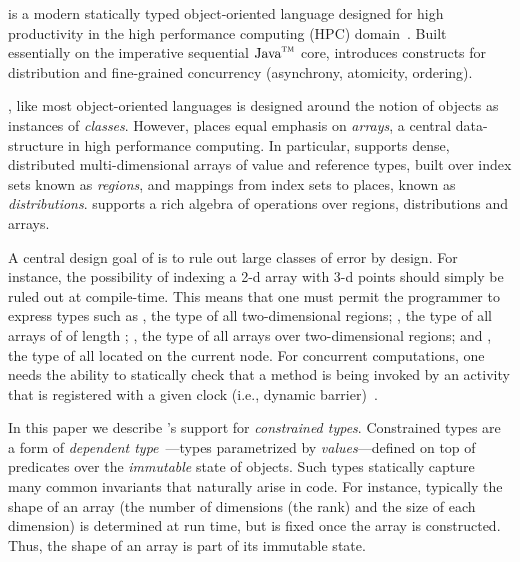 
%

%
%
%

\Xten{} is a modern statically typed object-oriented
language designed for high productivity in the high performance
computing (HPC) domain~\cite{X10}. Built essentially on the
imperative sequential $\mbox{Java}^{\mbox{\scriptsize\sc tm}}$
core, \Xten{} introduces constructs for distribution and
fine-grained concurrency (asynchrony, atomicity, ordering).

\Xten{}, like most object-oriented languages is designed around
the notion of objects as instances of {\em classes}. However, \Xten{}
places equal emphasis on {\em arrays}, a central data-structure in
high performance computing. In particular, \Xten{} supports dense,
distributed multi-dimensional arrays of value and reference types,
built over index sets known as {\em regions}, and mappings from index
sets to places, known as {\em distributions}.  \Xten{} supports a rich
algebra of operations over regions, distributions and arrays.

A central design goal of \Xten{} is to rule out large classes of error
by design. For instance, the possibility of indexing a 2-d array with 3-d
points should simply be ruled out at compile-time. This means that one
must permit the programmer to express types such as ,
the type of all two-dimensional regions; , the
type of all arrays of  of length ; , the type of all  arrays over two-dimensional regions; and
, the type of all  located on the
current node. For concurrent computations, one needs the ability to
statically check that a method is being invoked by an activity that is
registered with a given clock (i.e., dynamic barrier)~\cite{X10}.

In this paper we describe {\Xten}'s support for {\em
constrained types}.  
Constrained types are a form of {\em dependent
type}~\cite{dependent-types,xi99dependent,ocrz-ecoop03,aspinall-attapl,cayenne,epigram-matter,calc-constructions}---types parametrized by {\em values}---defined 
on top of predicates over the {\em immutable}
state of objects. Such types statically capture many common invariants
that naturally arise in code. For instance, typically the shape of an
array (the number of dimensions (the rank) and the size of each dimension)
is determined at
run time, but is fixed once the array is constructed. Thus, the shape of an
array is part of its immutable state.

